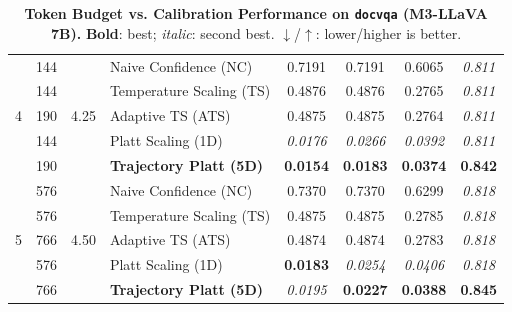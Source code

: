 \begin{table}[t]
\begin{tabular}{ccclcccc}
\midrule
\multirow{5}{*}{4} & 144 & \multirow{5}{*}{4.25} & Naive Confidence (NC) & 0.7191 & 0.7191 & 0.6065 & \textit{0.811} \\
 & 144 &  & Temperature Scaling (TS) & 0.4876 & 0.4876 & 0.2765 & \textit{0.811} \\
 & 190 &  & Adaptive TS (ATS) & 0.4875 & 0.4875 & 0.2764 & \textit{0.811} \\
 & 144 &  & Platt Scaling (1D) & \textit{0.0176} & \textit{0.0266} & \textit{0.0392} & \textit{0.811} \\
 & 190 &  & \textbf{Trajectory Platt (5D)} & \textbf{0.0154} & \textbf{0.0183} & \textbf{0.0374} & \textbf{0.842} \\
\midrule
\multirow{5}{*}{5} & 576 & \multirow{5}{*}{4.50} & Naive Confidence (NC) & 0.7370 & 0.7370 & 0.6299 & \textit{0.818} \\
 & 576 &  & Temperature Scaling (TS) & 0.4875 & 0.4875 & 0.2785 & \textit{0.818} \\
 & 766 &  & Adaptive TS (ATS) & 0.4874 & 0.4874 & 0.2783 & \textit{0.818} \\
 & 576 &  & Platt Scaling (1D) & \textbf{0.0183} & \textit{0.0254} & \textit{0.0406} & \textit{0.818} \\
 & 766 &  & \textbf{Trajectory Platt (5D)} & \textit{0.0195} & \textbf{0.0227} & \textbf{0.0388} & \textbf{0.845} \\
\bottomrule
\end{tabular}
\caption{\textbf{Token Budget vs. Calibration Performance on \texttt{docvqa} (M3-LLaVA 7B).} \textbf{Bold}: best; \textit{italic}: second best. $\downarrow$/$\uparrow$: lower/higher is better.}
\label{tab:token_budget_docvqa_m3}
\end{table}


